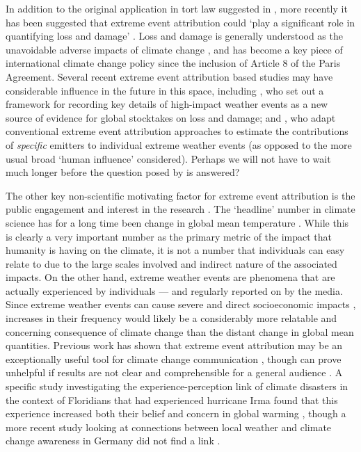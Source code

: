   In addition to the original application in tort law suggested in \citet{allen_liability_2003}, more recently it has been suggested that extreme event attribution could `play a significant role in quantifying loss and damage' \citep{wehner_operational_2022}. Loss and damage is generally understood as the unavoidable adverse impacts of climate change \citep{mace_loss_2016}, and has become a key piece of international climate change policy since the inclusion of Article 8 of the Paris Agreement. Several recent extreme event attribution based studies may have considerable influence in the future in this space, including \citet{clarke_inventories_2021}, who set out a framework for recording key details of high-impact weather events as a new source of evidence for global stocktakes on loss and damage; and \citet{otto_assigning_2017,lott_quantifying_2021}, who adapt conventional extreme event attribution approaches to estimate the contributions of \emph{specific} emitters to individual extreme weather events (as opposed to the more usual broad `human influence' considered). Perhaps we will not have to wait much longer before the question posed by \citeauthor{allen_liability_2003} is answered?

  The other key non-scientific motivating factor for extreme event attribution is the public engagement and interest in the research  \citep{swain_attributing_2020}. The `headline' number in climate science has for a long time been change in global mean temperature \citep{stocker_climate_2013,ipcc_global_2018,masson-delmotte_climate_2021}. While this is clearly a very important number as the primary metric of the impact that humanity is having on the climate, it is not a number that individuals can easy relate to due to the large scales involved and indirect nature of the associated impacts. On the other hand, extreme weather events are phenomena that are actually experienced by individuals --- and regularly reported on by the media. Since extreme weather events can cause severe and direct socioeconomic impacts \citep{fouillet_excess_2006}, increases in their frequency would likely be a considerably more relatable and concerning consequence of climate change than the distant change in global mean quantities. Previous work has shown that extreme event attribution may be an exceptionally useful tool for climate change communication \citep{ettinger_whats_2021}, though can prove unhelpful if results are not clear and comprehensible for a general audience \citep[for example if different attribution studies regarding a single event appear to provide conflicting headline results,][]{osaka_natural_2020}. A specific study investigating the experience-perception link of climate disasters in the context of Floridians that had experienced hurricane Irma found that this experience increased both their belief and concern in global warming \citep{bergquist_experiencing_2019}, though a more recent study looking at connections between local weather and climate change awareness in Germany did not find a link \citep{gartner_experiencing_2021}.


